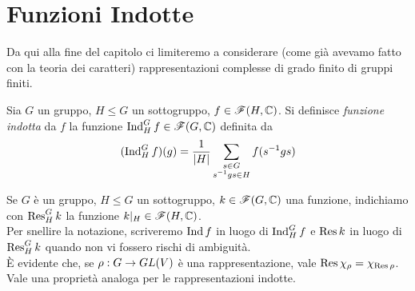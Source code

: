 \section{Funzioni Indotte}
Da qui alla fine del capitolo ci limiteremo a considerare (come già avevamo fatto con la teoria dei caratteri) rappresentazioni complesse di grado finito di gruppi finiti.

\begin{definition}
Sia $G$ un gruppo, $H\le G$ un sottogruppo, $f\in\mathscr{F}(H,\mathbb{C})$. Si definisce \emph{funzione indotta} da $f$ la funzione $\operatorname{Ind}_H^Gf\in\mathscr{F}(G,\mathbb{C})$ definita da
$$
(\operatorname{Ind}_H^Gf)(g)=\frac{1}{|H|}\sum_{\substack{s\in G\\s^{-1}gs\in H}}f(s^{-1}gs)
$$
\end{definition}

Se $G$ è un gruppo, $H\le G$ un sottogruppo, $k\in\mathscr{F}(G,\mathbb{C})$ una funzione, indichiamo con $\operatorname{Res}_H^Gk$ la funzione $k|_H\in\mathscr{F}(H,\mathbb{C})$.\\
Per snellire la notazione, scriveremo $\operatorname{Ind} f$ in luogo di $\operatorname{Ind}_H^G f$ e $\operatorname{Res} k$ in luogo di $\operatorname{Res}_H^G k$ quando non vi fossero rischi di ambiguità.\\
È evidente che, se $\rho:G\to GL(V)$ è una rappresentazione, vale $\operatorname{Res}\chi_\rho=\chi_{\operatorname{Res}\rho}$. Vale una proprietà analoga per le rappresentazioni indotte.

